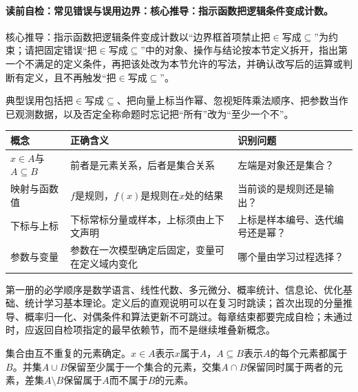 \paragraph{读前自检：常见错误与误用边界：核心推导：指示函数把逻辑条件变成计数。}核心推导：指示函数把逻辑条件变成计数以“边界框首项禁止把$\in$写成$\subseteq$”为约束；请把固定错误“把$\in$写成$\subseteq$”中的对象、操作与结论按本节定义拆开，指出第一个不满足的定义条件，再把该处改为本节允许的写法，并确认改写后的运算或判断有定义，且不再触发“把$\in$写成$\subseteq$”。\par

\begin{warningbox}\label{schema:V1-C01:CH-30}
典型误用包括把$\in$写成$\subseteq$、把向量上标当作幂、忽视矩阵乘法顺序、把参数当作已观测数据，以及否定全称命题时忘记把“所有”改为“至少一个不”。
\end{warningbox}

\begin{comparisonbox}\label{schema:V1-C01:CH-31}
\begin{tabularx}{\linewidth}{@{}lXX@{}}
\toprule
概念 & 正确含义 & 识别问题\\
\midrule
$x\in A$与$A\subseteq B$ & 前者是元素关系，后者是集合关系 & 左端是对象还是集合？\\
映射与函数值 & $f$是规则，$f(x)$是规则在$x$处的结果 & 当前谈的是规则还是输出？\\
下标与上标 & 下标常标分量或样本，上标须由上下文声明 & 上标是样本编号、迭代编号还是幂？\\
参数与变量 & 参数在一次模型确定后固定，变量可在定义域内变化 & 哪个量由学习过程选择？\\
\bottomrule
\end{tabularx}
\end{comparisonbox}

第一册的必学顺序是数学语言、线性代数、多元微分、概率统计、信息论、优化基础、统计学习基本理论。定义后的直观说明可以在复习时跳读；首次出现的分量推导、概率归一化、对偶条件和算法更新不可跳过。每章结束都要完成自检；未通过时，应返回自检项指定的最早依赖节，而不是继续堆叠新概念。


集合由互不重复的元素确定。$x\in A$表示$x$属于$A$，$A\subseteq B$表示$A$的每个元素都属于$B$。并集$A\cup B$保留至少属于一个集合的元素，交集$A\cap B$保留同时属于两者的元素，差集$A\setminus B$保留属于$A$而不属于$B$的元素。


